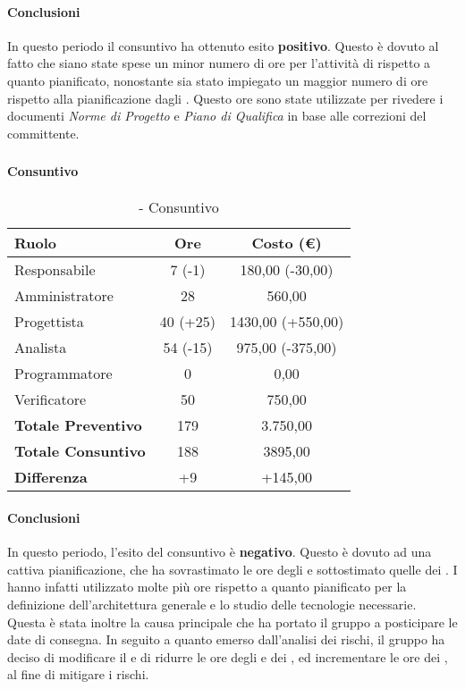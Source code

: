 \documentclass[./PianoDiProgetto.tex]{subfiles}
\begin{document}
	\paragraph{Conclusioni}
	In questo periodo il consuntivo ha ottenuto esito \textbf{positivo}. Questo è dovuto al fatto che siano state spese un minor numero di ore  per l'attività di  rispetto a quanto pianificato, nonostante sia stato impiegato un maggior numero di ore rispetto alla pianificazione dagli \AMMP{}. Questo ore sono state utilizzate per rivedere i documenti \textit{Norme di Progetto} e \textit{Piano di Qualifica} in base alle correzioni del committente.

\subsubsection{\PerPA}
\paragraph{Consuntivo}
	\begin{table}[h]
		\centering
		\begin{tabular}{l * {2}{c}}
			\toprule
			\textbf{Ruolo} & \textbf{Ore} & \textbf{Costo (\euro{})} \\
			\midrule
			Responsabile &	7 (-1) & 180,00 (-30,00) \\
			Amministratore & 28 & 560,00\\
			Progettista & 40 (+25) & 1430,00 (+550,00)\\
			Analista & 54 (-15)  & 975,00 (-375,00)\\
			Programmatore & 0 & 0,00 \\
			Verificatore & 50 & 750,00\\
			\midrule
			\textbf{Totale Preventivo} & 179
 & 3.750,00
 \\
			\textbf{Totale Consuntivo} & 188 & 3895,00
 \\
			\midrule
			\textbf{Differenza} & +9 & +145,00 \\
			\bottomrule
		\end{tabular}
		\caption{\PerPA{} - Consuntivo}
	\end{table}
	\paragraph{Conclusioni}
			In questo periodo, l'esito del consuntivo è \textbf{negativo}. Questo è dovuto ad una cattiva pianificazione, che ha sovrastimato le ore degli \ANP{} e sottostimato quelle dei \PJP{}. I \PJP{} hanno infatti utilizzato molte più ore rispetto a quanto pianificato per la definizione dell'architettura generale e lo studio delle tecnologie necessarie. Questa è stata inoltre la causa principale che ha portato il gruppo a posticipare le date di consegna. In seguito a quanto emerso dall'analisi dei rischi, il gruppo ha deciso di modificare il \PPdocRP{} e di ridurre le ore degli \ANP{} e dei \VERP{}, ed incrementare le ore dei \PJP, al fine di mitigare i rischi.
\end{document}
